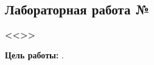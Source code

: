 \begin{center}
  \section{Лабораторная работа № \LabNum}
  \textbf{
    <<\LabTheme>>
  }
\end{center}
\textbf{
  Цель работы:
}
\LabTask.



